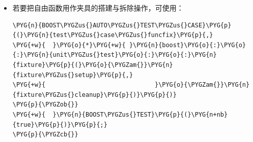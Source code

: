 \begin{itemize}
\begin{codeblockbg}
\begin{Verbatim}[commandchars=\\\{\},breaklines=true,breakanywhere=true,fontsize=\codefont,xleftmargin=17bp]
\PYG{n}{BOOST\PYGZus{}AUTO\PYGZus{}TEST\PYGZus{}CASE}\PYG{p}{(}\PYG{n}{test\PYGZus{}case\PYGZus{}multifix}\PYG{p}{,}
\PYG{+w}{  }\PYG{o}{*}\PYG{+w}{ }\PYG{n}{boost}\PYG{o}{:}\PYG{o}{:}\PYG{n}{unit\PYGZus{}test}\PYG{o}{:}\PYG{o}{:}\PYG{n}{fixture}\PYG{o}{\PYGZlt{}}\PYG{n}{extended\PYGZus{}fixture}\PYG{o}{\PYGZgt{}}
\PYG{+w}{      }\PYG{p}{(}\PYG{n}{std}\PYG{o}{:}\PYG{o}{:}\PYG{n}{string}\PYG{p}{(}\PYG{l+s}{\PYGZdq{}}\PYG{l+s}{fix1}\PYG{l+s}{\PYGZdq{}}\PYG{p}{)}\PYG{p}{)}
\PYG{+w}{  }\PYG{o}{*}\PYG{+w}{ }\PYG{n}{boost}\PYG{o}{:}\PYG{o}{:}\PYG{n}{unit\PYGZus{}test}\PYG{o}{:}\PYG{o}{:}\PYG{n}{fixture}\PYG{o}{\PYGZlt{}}\PYG{n}{extended\PYGZus{}fixture}\PYG{o}{\PYGZgt{}}
\PYG{+w}{      }\PYG{p}{(}\PYG{n}{std}\PYG{o}{:}\PYG{o}{:}\PYG{n}{string}\PYG{p}{(}\PYG{l+s}{\PYGZdq{}}\PYG{l+s}{fix2}\PYG{l+s}{\PYGZdq{}}\PYG{p}{)}\PYG{p}{)}
\PYG{+w}{  }\PYG{o}{*}\PYG{+w}{ }\PYG{n}{boost}\PYG{o}{:}\PYG{o}{:}\PYG{n}{unit\PYGZus{}test}\PYG{o}{:}\PYG{o}{:}\PYG{n}{fixture}\PYG{o}{\PYGZlt{}}\PYG{n}{standard\PYGZus{}fixture}\PYG{o}{\PYGZgt{}}\PYG{p}{(}\PYG{p}{)}\PYG{p}{)}
\PYG{p}{\PYGZob{}}
\PYG{+w}{  }\PYG{n}{BOOST\PYGZus{}TEST}\PYG{p}{(}\PYG{n+nb}{true}\PYG{p}{)}\PYG{p}{;}
\PYG{p}{\PYGZcb{}}
\end{Verbatim}
\end{codeblockbg}



\item 若要把自由函数用作夹具的搭建与拆除操作，可使用：



\begin{codeblockbg}
\begin{Verbatim}[commandchars=\\\{\},breaklines=true,breakanywhere=true,fontsize=\codefont,xleftmargin=17bp]
\PYG{n}{BOOST\PYGZus{}AUTO\PYGZus{}TEST\PYGZus{}CASE}\PYG{p}{(}\PYG{n}{test\PYGZus{}case\PYGZus{}funcfix}\PYG{p}{,}
\PYG{+w}{  }\PYG{o}{*}\PYG{+w}{ }\PYG{n}{boost}\PYG{o}{:}\PYG{o}{:}\PYG{n}{unit\PYGZus{}test}\PYG{o}{:}\PYG{o}{:}\PYG{n}{fixture}\PYG{p}{(}\PYG{o}{\PYGZam{}}\PYG{n}{fixture\PYGZus{}setup}\PYG{p}{,}
\PYG{+w}{                              }\PYG{o}{\PYGZam{}}\PYG{n}{fixture\PYGZus{}cleanup}\PYG{p}{)}\PYG{p}{)}
\PYG{p}{\PYGZob{}}
\PYG{+w}{  }\PYG{n}{BOOST\PYGZus{}TEST}\PYG{p}{(}\PYG{n+nb}{true}\PYG{p}{)}\PYG{p}{;}
\PYG{p}{\PYGZcb{}}
\end{Verbatim}
\end{codeblockbg}



\end{itemize}
